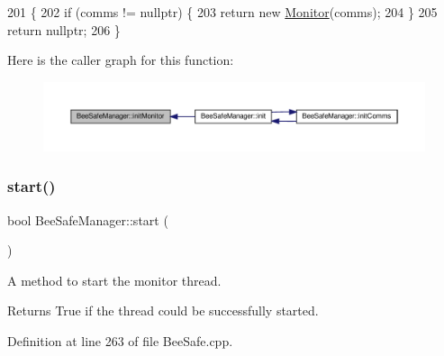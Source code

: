 \begin{DoxyCode}
201 \{
202     \textcolor{keywordflow}{if} (comms != \textcolor{keyword}{nullptr}) \{
203         \textcolor{keywordflow}{return} \textcolor{keyword}{new} \hyperlink{class_monitor}{Monitor}(comms);
204     \}
205     \textcolor{keywordflow}{return} \textcolor{keyword}{nullptr};
206 \}
\end{DoxyCode}
Here is the caller graph for this function\+:\nopagebreak
\begin{figure}[H]
\begin{center}
\leavevmode
\includegraphics[width=350pt]{d5/d75/class_bee_safe_manager_ad30babe45ead2cb6a5b0559afa5bc5ff_icgraph}
\end{center}
\end{figure}
\mbox{\label{class_bee_safe_manager_a7242d89761621de0e09ec9ea360fca27}} 
\subsubsection{\texorpdfstring{start()}{start()}}
{\footnotesize\ttfamily bool Bee\+Safe\+Manager\+::start (\begin{DoxyParamCaption}{ }\end{DoxyParamCaption})}

A method to start the monitor thread.

\begin{DoxyReturn}{Returns}
True if the thread could be successfully started. 
\end{DoxyReturn}


Definition at line 263 of file Bee\+Safe.\+cpp.


